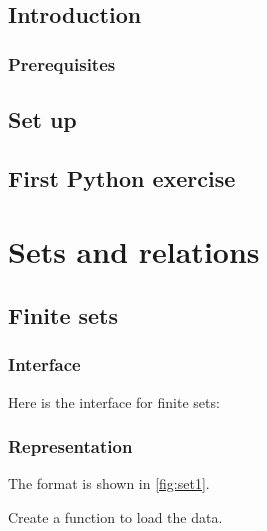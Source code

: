 \section{Introduction}

\subsection{Prerequisites}


\section{Set up}



\section{First Python exercise}



\chapter{Sets and relations}


\section{Finite sets}

\subsection*{Interface}
Here is the interface for finite sets:
%

%

\subsection*{Representation}
The format is shown in \cref{fig:set1}.



\begin{exercise}
  Create a function to load the data.

%

\end{exercise}

